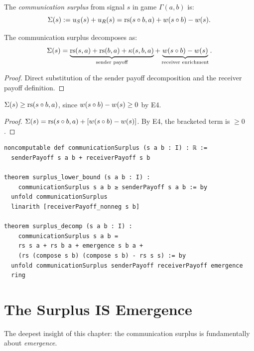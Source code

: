 \begin{definition}
\label{def:comm-surplus}
The \emph{communication surplus} from signal $s$ in game $\Gamma(a, b)$ is:
\[
\Sigma(s) := u_S(s) + u_R(s) = \mathrm{rs}(s \circ b, a) + w(s \circ b) - w(s).
\]
\end{definition}

\begin{theorem}
\label{thm:surplus-decomp}
The communication surplus decomposes as:
\[
\Sigma(s) = \underbrace{\mathrm{rs}(s, a) + \mathrm{rs}(b, a) + \kappa(s, b, a)}_{\text{sender payoff}} +
\underbrace{w(s \circ b) - w(s)}_{\text{receiver enrichment}}.
\]
\end{theorem}

\begin{proof}
Direct substitution of the sender payoff decomposition and the receiver
payoff definition.
\end{proof}

\begin{theorem}
\label{thm:surplus-lower}
$\Sigma(s) \geq \mathrm{rs}(s \circ b, a)$, since $w(s \circ b) - w(s) \geq 0$
by E4.
\end{theorem}

\begin{proof}
$\Sigma(s) = \mathrm{rs}(s \circ b, a) + [w(s \circ b) - w(s)]$.
By E4, the bracketed term is $\geq 0$.
\end{proof}

\begin{lstlisting}[caption={Lean 4: Communication surplus}]
noncomputable def communicationSurplus (s a b : I) : ℝ :=
  senderPayoff s a b + receiverPayoff s b

theorem surplus_lower_bound (s a b : I) :
    communicationSurplus s a b ≥ senderPayoff s a b := by
  unfold communicationSurplus
  linarith [receiverPayoff_nonneg s b]

theorem surplus_decomp (s a b : I) :
    communicationSurplus s a b =
    rs s a + rs b a + emergence s b a +
    (rs (compose s b) (compose s b) - rs s s) := by
  unfold communicationSurplus senderPayoff receiverPayoff emergence
  ring
\end{lstlisting}


\section{The Surplus IS Emergence}

The deepest insight of this chapter: the communication surplus is fundamentally
about \emph{emergence}.

